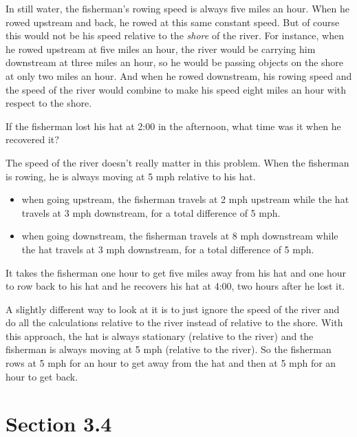 \documentclass[letterpaper]{exam}
\begin{document}
\begin{questions}
  In still water, the fisherman's rowing speed is always five miles an hour.
  When he rowed upstream and back, he rowed at this same constant speed.  But
  of course this would not be his speed relative to the {\em shore\/} of the
  river.  For instance, when he rowed upstream at five miles an hour, the river
  would be carrying him downstream at three miles an hour, so he would be
  passing objects on the shore at only two miles an hour.  And when he rowed
  downstream, his rowing speed and the speed of the river would combine to make
  his speed eight miles an hour with respect to the shore.

  If the fisherman lost his hat at 2:00 in the afternoon, what time was it when
  he recovered it?

  \begin{solution}
    The speed of the river doesn't really matter in this problem.  When the
    fisherman is rowing, he is always moving at 5 mph relative to his hat.

    \begin{itemize} 
      \item when going upstream, the fisherman travels at 2 mph upstream while
        the hat travels at 3 mph downstream, for a total difference of 5 mph.  

      \item when going downstream, the fisherman travels at 8 mph downstream
        while the hat travels at 3 mph downstream, for a total difference of 5
        mph.  
    \end{itemize}

    It takes the fisherman one hour to get five miles away from his hat and
    one hour to row back to his hat and he recovers his hat at 4:00, two hours
    after he lost it.

    A slightly different way to look at it is to just ignore the speed of the
    river and do all the calculations relative to the river instead of relative
    to the shore.  With this approach, the hat is always stationary (relative to
    the river) and the fisherman is always moving at 5 mph (relative to the
    river).  So the fisherman rows at 5 mph for an hour to get away from the hat
    and then at 5 mph for an hour to get back.
    \end{solution}

  \end{questions}

  \ifprintanswers{}
    \section{Section 3.4} %
    
\end{document}
